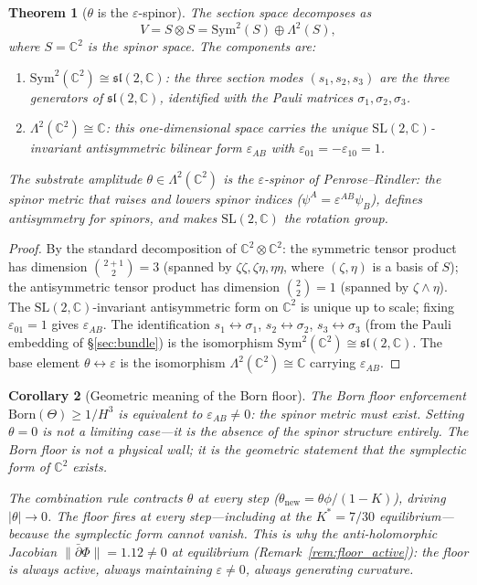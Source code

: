 \documentclass[11pt,a4paper]{article}
\newtheorem{theorem}{Theorem}[section]
\newtheorem{corollary}[theorem]{Corollary}
\theoremstyle{definition}
\theoremstyle{remark}
\newcommand{\C}{\mathbb{C}}
\newcommand{\dbar}{\bar{\partial}}
\begin{document}
\begin{theorem}[$\theta$ is the $\varepsilon$-spinor]\label{thm:theta_epsilon}
The section space decomposes as
\begin{equation}\label{eq:section_decomp}
V = S\otimes S = \mathrm{Sym}^2(S)\oplus\Lambda^2(S),
\end{equation}
where $S=\C^2$ is the spinor space. The components are:
\begin{enumerate}[nosep]
\item $\mathrm{Sym}^2(\C^2)\cong\mathfrak{sl}(2,\C)$: the three section modes $(s_1,s_2,s_3)$ are the three generators of $\mathfrak{sl}(2,\C)$, identified with the Pauli matrices $\sigma_1,\sigma_2,\sigma_3$.
\item $\Lambda^2(\C^2)\cong\C$: this one-dimensional space carries the unique $\mathrm{SL}(2,\C)$-invariant antisymmetric bilinear form $\varepsilon_{AB}$ with $\varepsilon_{01}=-\varepsilon_{10}=1$.
\end{enumerate}
The substrate amplitude $\theta\in\Lambda^2(\C^2)$ \emph{is} the $\varepsilon$-spinor of Penrose--Rindler: the spinor metric that raises and lowers spinor indices ($\psi^A=\varepsilon^{AB}\psi_B$), defines antisymmetry for spinors, and makes $\mathrm{SL}(2,\C)$ the rotation group.
\end{theorem}

\begin{proof}
By the standard decomposition of $\C^2\otimes\C^2$: the symmetric tensor product has dimension $\binom{2+1}{2}=3$ (spanned by $\zeta\zeta,\zeta\eta,\eta\eta$, where $(\zeta,\eta)$ is a basis of $S$); the antisymmetric tensor product has dimension $\binom{2}{2}=1$ (spanned by $\zeta\wedge\eta$). The $\mathrm{SL}(2,\C)$-invariant antisymmetric form on $\C^2$ is unique up to scale; fixing $\varepsilon_{01}=1$ gives $\varepsilon_{AB}$. The identification $s_1\leftrightarrow\sigma_1$, $s_2\leftrightarrow\sigma_2$, $s_3\leftrightarrow\sigma_3$ (from the Pauli embedding of \S\ref{sec:bundle}) is the isomorphism $\mathrm{Sym}^2(\C^2)\cong\mathfrak{sl}(2,\C)$. The base element $\theta\leftrightarrow\varepsilon$ is the isomorphism $\Lambda^2(\C^2)\cong\C$ carrying $\varepsilon_{AB}$.
\end{proof}

\begin{corollary}[Geometric meaning of the Born floor]\label{cor:floor_epsilon}
The Born floor enforcement $\mathrm{Born}(\Theta)\geq 1/H^3$ is equivalent to $\varepsilon_{AB}\neq 0$: the spinor metric must exist. Setting $\theta=0$ is not a limiting case---it is the absence of the spinor structure entirely. The Born floor is not a physical wall; it is the geometric statement that the symplectic form of $\C^2$ exists.

The combination rule contracts $\theta$ at every step ($\theta_\mathrm{new}=\theta\phi/(1-K)$), driving $|\theta|\to 0$. The floor fires at every step---including at the $K^*=7/30$ equilibrium---because the symplectic form cannot vanish. This is why the anti-holomorphic Jacobian $\|\dbar\Phi\|=1.12\neq 0$ at equilibrium (Remark~\ref{rem:floor_active}): the floor is always active, always maintaining $\varepsilon\neq 0$, always generating curvature.
\end{corollary}
\end{document}
